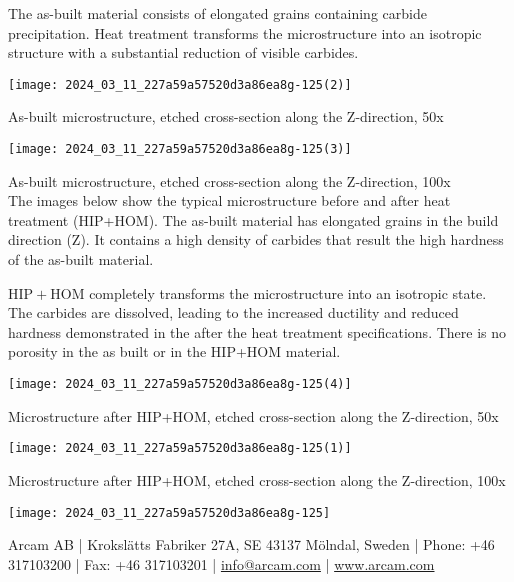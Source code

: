 \documentclass[10pt]{article}
\begin{document}
The as-built material consists of elongated grains containing carbide precipitation. Heat treatment transforms the microstructure into an isotropic structure with a substantial reduction of visible carbides.

\begin{center}
\texttt{[image: 2024\_03\_11\_227a59a57520d3a86ea8g-125(2)]}
\end{center}

As-built microstructure, etched cross-section along the Z-direction, 50x

\begin{center}
\texttt{[image: 2024\_03\_11\_227a59a57520d3a86ea8g-125(3)]}
\end{center}

As-built microstructure, etched cross-section along the Z-direction, 100x\\
The images below show the typical microstructure before and after heat treatment (HIP+HOM). The as-built material has elongated grains in the build direction (Z). It contains a high density of carbides that result the high hardness of the as-built material.

$\mathrm{HIP}+\mathrm{HOM}$ completely transforms the microstructure into an isotropic state. The carbides are dissolved, leading to the increased ductility and reduced hardness demonstrated in the after the heat treatment specifications. There is no porosity in the as built or in the HIP+HOM material.

\begin{center}
\texttt{[image: 2024\_03\_11\_227a59a57520d3a86ea8g-125(4)]}
\end{center}

Microstructure after HIP+HOM, etched cross-section along the Z-direction, 50x

\begin{center}
\texttt{[image: 2024\_03\_11\_227a59a57520d3a86ea8g-125(1)]}
\end{center}

Microstructure after HIP+HOM, etched cross-section along the Z-direction, 100x

\begin{center}
\texttt{[image: 2024\_03\_11\_227a59a57520d3a86ea8g-125]}
\end{center}

Arcam AB | Krokslätts Fabriker 27A, SE 43137 Mölndal, Sweden | Phone: +46 317103200 | Fax: +46 317103201 | \href{mailto:info@arcam.com}{info@arcam.com} | \href{http://www.arcam.com}{www.arcam.com}
\end{document}
